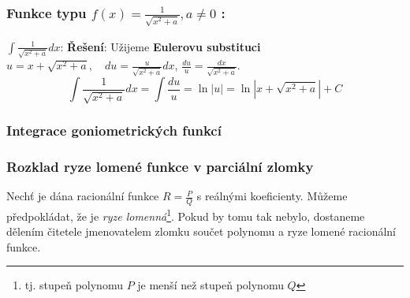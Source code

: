       \subsubsection*{Funkce typu $\boxed{f(x)=\frac{1}{\sqrt{x^2+a}}}, a\neq0$ :}
         \begin{example}\label{ma:ex_sub_metoda1}$\displaystyle\int{\frac{1}{\sqrt{x^2+a}}dx}$:\vskip0.5mm
           \textbf{Řešení}: Užijeme \textbf{Eulerovu substituci}\vskip1mm 
                            \hskip17mm$u=x+\sqrt{x^2+a},\quad \displaystyle{du=\frac{u}{\sqrt{x^2+a}}dx}$,
                            $\displaystyle{\frac{du}{u}=\frac{dx}{\sqrt{x^2+a}}}.$
           \begin{equation*}
            \int{\frac{1}{\sqrt{x^2+a}}dx}=\int{\frac{du}{u}}=\ln|u|=\ln|x+\sqrt{x^2+a}|+C
           \end{equation*}
         \end{example}
  
    \subsubsection{Integrace goniometrických funkcí}
      
    \subsubsection{Rozklad ryze lomené funkce v parciální zlomky}
      Nechť je dána racionální funkce $R = \frac{P}{Q}$ s reálnými koeficienty. Můžeme
      předpokládat, že je \emph{ryze lomenná}\footnote{tj. stupeň polynomu $P$ je menší než
      stupeň polynomu $Q$}. Pokud by tomu tak nebylo, dostaneme dělením čitetele jmenovatelem
      zlomku součet polynomu a ryze lomené racionální funkce.
      
